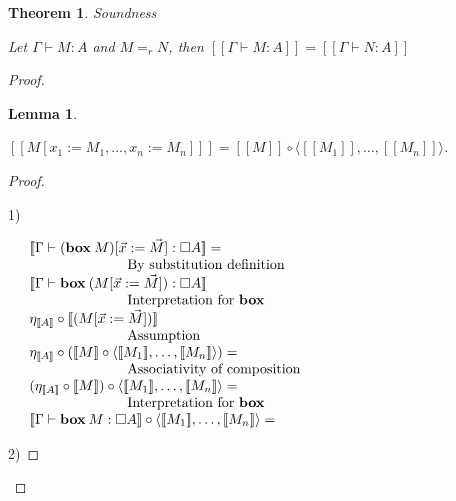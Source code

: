 \documentclass[a4paper]{article}
\newtheorem{theorem}{Theorem}
\newtheorem{lemma}{Lemma}
\begin{document}
\begin{theorem} Soundness

  Let $\Gamma \vdash M : A$ and $M =_r N$, then $[\![\Gamma \vdash M : A]\!] = [\![\Gamma \vdash N : A]\!]$
\end{theorem}

\begin{proof}


\begin{lemma}
$ $

$[\![M [x_1 := M_1,\dots, x_n := M_n]]\!] = [\![M]\!] \circ \langle [\![M_1]\!], \dots, [\![M_n]\!] \rangle$.

\end{lemma}

\begin{proof}

$ $

1)

$\begin{array}{lll}
& [\![\Gamma \vdash ({\bf box \:} M) [ \vec{x} := \vec{M}] : \Box A]\!] = & \\
&\quad\quad\quad\quad\quad\quad\quad \text{By substitution definition}& \\
&[\![ \Gamma \vdash {\bf box \:} (M [ \vec{x} := \vec{M}]) : \Box A]\!]& \\
&\quad\quad\quad\quad\quad\quad\quad \text{Interpretation for {\bf box}}\\
&\eta_{[\![A]\!]} \circ [\![(M [ \vec{x} := \vec{M}])]\!]& \\
&\quad\quad\quad\quad\quad\quad\quad \text{Assumption} \\
&\eta_{[\![A]\!]} \circ ([\![M]\!] \circ \langle [\![M_1]\!], \dots, [\![M_n]\!] \rangle) = & \\
&\quad\quad\quad\quad\quad\quad\quad \text{Associativity of composition}&\\
&(\eta_{[\![A]\!]} \circ [\![M]\!]) \circ \langle [\![M_1]\!], \dots, [\![M_n]\!] \rangle = & \\
&\quad\quad\quad\quad\quad\quad\quad  \text{Interpretation for {\bf box}}& \\
&[\![ \Gamma \vdash {\bf box \:} M : \Box A]\!] \circ \langle [\![M_1]\!], \dots, [\![M_n]\!] \rangle = & \\
\end{array}$

\vspace{\baselineskip}

2)

\vspace{\baselineskip}


\end{proof}
\end{proof}
\end{document}
